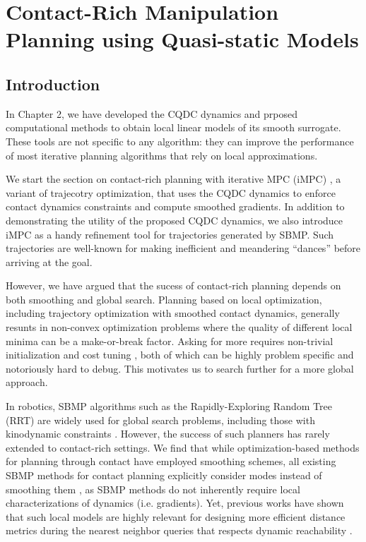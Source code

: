 \chapter{Contact-Rich Manipulation Planning using Quasi-static Models} \label{chapter:contact_rich_planning}
\section{Introduction}
In Chapter 2, we have developed the CQDC dynamics and prposed computational methods to obtain local linear models of its smooth surrogate. These tools are not specific to any algorithm: they can improve the performance of most iterative planning algorithms that rely on local approximations. 

We start the section on contact-rich planning with iterative MPC (iMPC) \cite{bundledgradients}, a variant of trajecotry optimization, that uses the CQDC dynamics to enforce contact dynamics constraints and compute smoothed gradients. In addition to demonstrating the utility of the proposed CQDC dynamics, we also introduce iMPC as a handy refinement tool for trajectories generated by SBMP. Such trajectories are well-known for making inefficient and meandering ``dances'' before arriving at the goal. 

However, we have argued that the sucess of contact-rich planning depends on both smoothing and global search. Planning based on local optimization, including trajectory optimization with smoothed contact dynamics, generally resunts in non-convex optimization problems where the quality of different local minima can be a make-or-break factor. Asking for more requires non-trivial initialization and cost tuning \cite{onol2020tuning}, both of which can be highly problem specific and notoriously hard to debug. This motivates us to search further for a more global approach.

In robotics, SBMP algorithms such as the Rapidly-Exploring Random Tree (RRT) \cite{lavalle1998rapidly} are widely used for global search problems, including those with kinodynamic constraints \cite{karaman2010optimal}. However, the success of such planners has rarely extended to contact-rich settings. We find that while optimization-based methods for planning through contact have employed smoothing schemes, all existing SBMP methods for contact planning explicitly consider modes instead of smoothing them \cite{cheng2021contact,wu2020r3t,chen2021trajectotree,motioncones,terry}, as SBMP methods do not inherently require local characterizations of dynamics (i.e. gradients). Yet, previous works have shown that such local models are highly relevant for designing more efficient distance metrics during the nearest neighbor queries that respects dynamic reachability \cite{shkolnik2009reachability,wu2020r3t,haddad2021anytime}.

